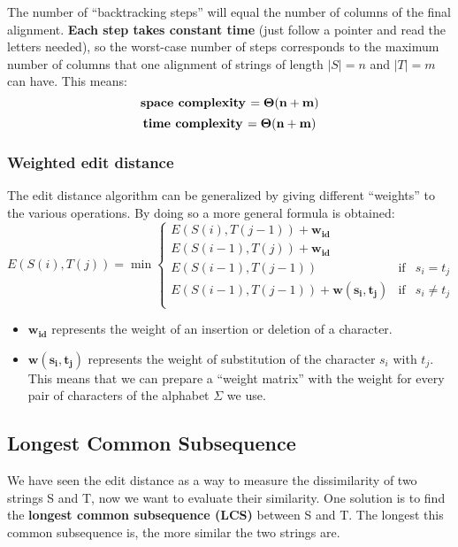 \documentclass[../main.tex]{subfiles}
\begin{document}
The number of ``backtracking steps'' will equal the number of columns of the final alignment. \textbf{Each step takes constant time} (just follow a pointer and read the letters needed), so the worst-case number of steps corresponds to the maximum number of columns that one alignment of strings of length $|S|=n$ and $|T|=m$ can have. This means:
$$\mbox{\textbf{space complexity }} \mathbf{= \Theta(n+m)}$$
$$\mbox{\textbf{time complexity }} \mathbf{= \Theta(n+m)}$$

\subsubsection{Weighted edit distance}

The edit distance algorithm can be generalized by giving different ``weights'' to the various operations. By doing so a more general formula is obtained:
$$
	E(S(i), T(j)) = \min \left\{\begin{array}{rcl}
		E(S(i), T(j-1)) + \mathbf{w_{id}}                                   \\
		E(S(i-1), T(j)) + \mathbf{w_{id}}                                   \\
		E(S(i-1), T(j-1))                        & \mbox{if} & s_i = t_j    \\
		E(S(i-1), T(j-1)) + \mathbf{w(s_i, t_j)} & \mbox{if} & s_i \neq t_j \\
	\end{array}
	\right.
$$
\begin{itemize}
	\item $\mathbf{w_{id}}$ represents the weight of an insertion or deletion of a character.
	\item $\mathbf{w(s_i, t_j)}$ represents the weight of substitution of the character $s_i$ with $t_j$. This means that we can prepare a ``weight matrix'' with the weight for every pair of characters of the alphabet $\Sigma$ we use.
\end{itemize}

\subsection{Longest Common Subsequence}

We have seen the edit distance as a way to measure the dissimilarity of two strings S and T, now we want to evaluate their similarity. One solution is to find the \textbf{longest common subsequence (LCS)} between S and T. The longest this common subsequence is, the more similar the two strings are.
\end{document}
